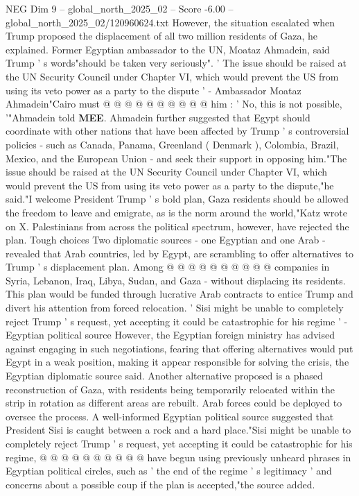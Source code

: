 \begin{textsample}{NEG Dim 9 – global\_north\_2025\_02 – Score -6.00 – global\_north\_2025\_02/120960624.txt}
However, the situation escalated when Trump proposed the displacement of all two million residents of Gaza, he explained.
Former Egyptian ambassador to the UN, Moataz Ahmadein, said Trump ' s words"should be taken very seriously". ' The issue should be raised at the UN Security Council under Chapter VI, which would prevent the US from using its veto power as a party to the dispute ' - Ambassador Moataz Ahmadein"Cairo must @ @ @ @ @ @ @ @ @ @ him : ' No, this is not possible, '"Ahmadein told \textbf{MEE}.
Ahmadein further suggested that Egypt should coordinate with other nations that have been affected by Trump ' s controversial policies - such as Canada, Panama, Greenland ( Denmark ), Colombia, Brazil, Mexico, and the European Union - and seek their support in opposing him."The issue should be raised at the UN Security Council under Chapter VI, which would prevent the US from using its veto power as a party to the dispute,"he said."I welcome President Trump ' s bold plan, Gaza residents should be allowed the freedom to leave and emigrate, as is the norm around the world,"Katz wrote on X.
Palestinians from across the political spectrum, however, have rejected the plan.
Tough choices Two diplomatic sources - one Egyptian and one Arab - revealed that Arab countries, led by Egypt, are scrambling to offer alternatives to Trump ' s displacement plan.
Among @ @ @ @ @ @ @ @ @ @ companies in Syria, Lebanon, Iraq, Libya, Sudan, and Gaza - without displacing its residents.
This plan would be funded through lucrative Arab contracts to entice Trump and divert his attention from forced relocation. ' Sisi might be unable to completely reject Trump ' s request, yet accepting it could be catastrophic for his regime ' - Egyptian political source However, the Egyptian foreign ministry has advised against engaging in such negotiations, fearing that offering alternatives would put Egypt in a weak position, making it appear responsible for solving the crisis, the Egyptian diplomatic source said.
Another alternative proposed is a phased reconstruction of Gaza, with residents being temporarily relocated within the strip in rotation as different areas are rebuilt.
Arab forces could be deployed to oversee the process.
A well-informed Egyptian political source suggested that President Sisi is caught between a rock and a hard place."Sisi might be unable to completely reject Trump ' s request, yet accepting it could be catastrophic for his regime, @ @ @ @ @ @ @ @ @ @ have begun using previously unheard phrases in Egyptian political circles, such as ' the end of the regime ' s legitimacy ' and concerns about a possible coup if the plan is accepted,"the source added.

\end{textsample}
